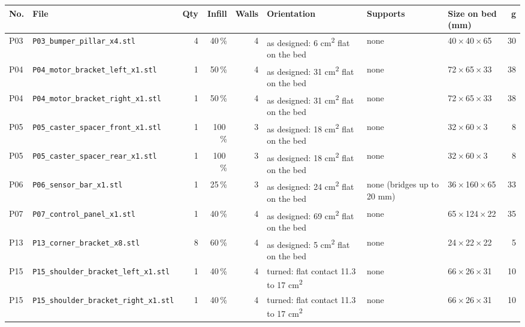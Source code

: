 {\footnotesize\setlength{\tabcolsep}{2.5pt}
\begin{longtable}{@{}lP{45mm}rrrP{25mm}P{25mm}P{21mm}r@{}}
\toprule
\textbf{No.} & \textbf{File} & \textbf{Qty} & \textbf{Infill} & \textbf{Walls} & \textbf{Orientation} & \textbf{Supports} & \textbf{Size on bed (mm)} & \textbf{g}\\
\midrule\endhead
P03 & {\scriptsize\nolinkurl{P03_bumper_pillar_x4.stl}} & 4 & 40\,\% & 4 & as designed: 6 cm\textsuperscript{2} flat on the bed & none & 40\,$\times$\,40\,$\times$\,65 & 30\\
P04 & {\scriptsize\nolinkurl{P04_motor_bracket_left_x1.stl}} & 1 & 50\,\% & 4 & as designed: 31 cm\textsuperscript{2} flat on the bed & none & 72\,$\times$\,65\,$\times$\,33 & 38\\
P04 & {\scriptsize\nolinkurl{P04_motor_bracket_right_x1.stl}} & 1 & 50\,\% & 4 & as designed: 31 cm\textsuperscript{2} flat on the bed & none & 72\,$\times$\,65\,$\times$\,33 & 38\\
P05 & {\scriptsize\nolinkurl{P05_caster_spacer_front_x1.stl}} & 1 & 100\,\% & 3 & as designed: 18 cm\textsuperscript{2} flat on the bed & none & 32\,$\times$\,60\,$\times$\,3 & 8\\
P05 & {\scriptsize\nolinkurl{P05_caster_spacer_rear_x1.stl}} & 1 & 100\,\% & 3 & as designed: 18 cm\textsuperscript{2} flat on the bed & none & 32\,$\times$\,60\,$\times$\,3 & 8\\
P06 & {\scriptsize\nolinkurl{P06_sensor_bar_x1.stl}} & 1 & 25\,\% & 3 & as designed: 24 cm\textsuperscript{2} flat on the bed & none (bridges up to 20 mm) & 36\,$\times$\,160\,$\times$\,65 & 33\\
P07 & {\scriptsize\nolinkurl{P07_control_panel_x1.stl}} & 1 & 40\,\% & 4 & as designed: 69 cm\textsuperscript{2} flat on the bed & none & 65\,$\times$\,124\,$\times$\,22 & 35\\
P13 & {\scriptsize\nolinkurl{P13_corner_bracket_x8.stl}} & 8 & 60\,\% & 4 & as designed: 5 cm\textsuperscript{2} flat on the bed & none & 24\,$\times$\,22\,$\times$\,22 & 5\\
P15 & {\scriptsize\nolinkurl{P15_shoulder_bracket_left_x1.stl}} & 1 & 40\,\% & 4 & turned: flat contact 11.3 to 17 cm\textsuperscript{2} & none & 66\,$\times$\,26\,$\times$\,31 & 10\\
P15 & {\scriptsize\nolinkurl{P15_shoulder_bracket_right_x1.stl}} & 1 & 40\,\% & 4 & turned: flat contact 11.3 to 17 cm\textsuperscript{2} & none & 66\,$\times$\,26\,$\times$\,31 & 10\\

\end{longtable}}
